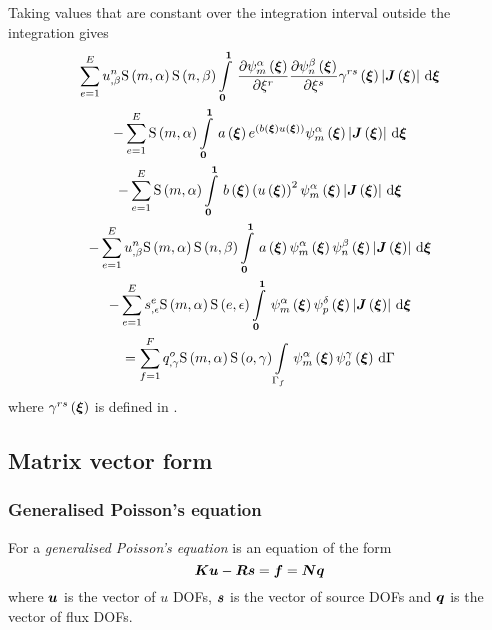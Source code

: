 Taking values that are constant over the integration interval outside the
integration gives
\begin{multline}
  \dsum_{e=1}^{E}\nodedof{u}{n}{\beta}\gsf{m}{\alpha}\gsf{n}{\beta}
  \gint{\vectr{0}}{\vectr{1}}{\delby{\gbfn{m}{\alpha}{\vectr{\xi}}}{\xi^{r}}
  \delby{\gbfn{n}{\beta}{\vectr{\xi}}}{\xi^{s}}\fnof{\gamma^{rs}}{\vectr{\xi}}
  \abs{\fnof{\matr{J}}{\vectr{\xi}}}}{\vectr{\xi}} \\ 
  -\dsum_{e=1}^{E}\gsf{m}{\alpha}\gint{\vectr{0}}{\vectr{1}}{\fnof{a}{\vectr{\xi}}
    e^{\pbrac{\fnof{b}{\vectr{\xi}}\fnof{u}{\vectr{\xi}}}}
    \gbfn{m}{\alpha}{\vectr{\xi}}\abs{\fnof{\matr{J}}{\vectr{\xi}}}}{\vectr{\xi}}\\
  -\dsum_{e=1}^{E}\gsf{m}{\alpha}\gint{\vectr{0}}{\vectr{1}}{\fnof{b}{\vectr{\xi}}
    \pbrac{\fnof{u}{\vectr{\xi}}}^{2}
    \gbfn{m}{\alpha}{\vectr{\xi}}\abs{\fnof{\matr{J}}{\vectr{\xi}}}}{\vectr{\xi}}\\
  -\dsum_{e=1}^{E}\nodedof{u}{n}{\beta}\gsf{m}{\alpha}\gsf{n}{\beta}
  \gint{\vectr{0}}{\vectr{1}}{\fnof{a}{\vectr{\xi}}\gbfn{m}{\alpha}{\vectr{\xi}}
    \gbfn{n}{\beta}{\vectr{\xi}}\abs{\fnof{\matr{J}}{\vectr{\xi}}}}{\vectr{\xi}}\\  
  -\dsum_{e=1}^{E}\nodedof{s}{e}{\epsilon}\gsf{m}{\alpha}\gsf{e}{\epsilon}
  \gint{\vectr{0}}{\vectr{1}}{\gbfn{m}{\alpha}{\vectr{\xi}}
    \gbfn{p}{\delta}{\vectr{\xi}}\abs{\fnof{\matr{J}}{\vectr{\xi}}}}{\vectr{\xi}}\\
  =\dsum_{f=1}^{F}\nodedof{q}{o}{\gamma}\gsf{m}{\alpha}\gsf{o}{\gamma}
  \gint{\Gamma_{f}}{}{\gbfn{m}{\alpha}{\vectr{\xi}}\gbfn{o}{\gamma}{\vectr{\xi}}
  }{\Gamma}
  \label{eqn:PoissonFemForm}
\end{multline}
where $ \gamma^{rs}\left(  \boldsymbol{\xi}  \right) $ is defined in 
.

\subsection{Matrix vector form}

\subsubsection{Generalised Poisson's equation}

For a \emph{generalised Poisson's equation}  is an equation of the form
\begin{equation}
  \matr{K}\vect{u}-\matr{R}\vect{s}=\vect{f}=\matr{N}\vect{q}
\end{equation}
where $\vect{u}$ is the vector of $u$ DOFs, $\vect{s}$ is the vector of source
DOFs and $ \boldsymbol{q} $ is the vector of flux DOFs.


